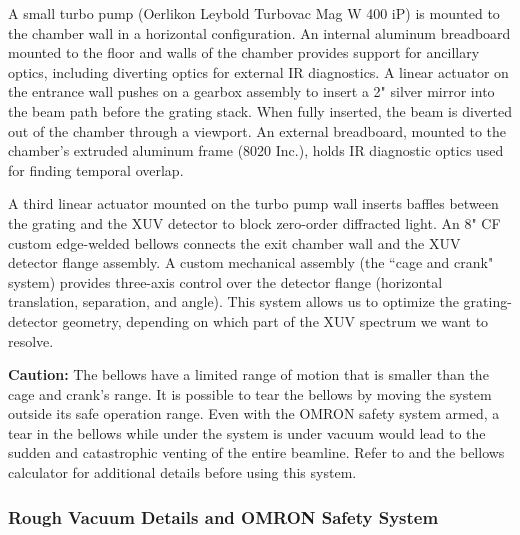 A small turbo pump (Oerlikon Leybold Turbovac Mag W 400 iP) is mounted to the chamber wall in a horizontal configuration. An internal aluminum breadboard mounted to the floor and walls of the chamber provides support for ancillary optics, including diverting optics for external IR diagnostics. A linear actuator on the entrance wall pushes on a gearbox assembly to insert a 2" silver mirror into the beam path before the grating stack. When fully inserted, the beam is diverted out of the chamber through a viewport. An external breadboard, mounted to the chamber's extruded aluminum frame (8020 Inc.), holds IR diagnostic optics used for finding temporal overlap.

A third linear actuator mounted on the turbo pump wall inserts baffles between the grating and the XUV detector to block zero-order diffracted light. An 8" CF custom edge-welded bellows connects the exit chamber wall and the XUV detector flange assembly. A custom mechanical assembly (the ``cage and crank" system) provides three-axis control over the detector flange (horizontal translation, separation, and angle). This system allows us to optimize the grating-detector geometry, depending on which part of the XUV spectrum we want to resolve.

\textbf{Caution:} The bellows have a limited range of motion that is smaller than the cage and crank's range. It is possible to tear the bellows by moving the system outside its safe operation range. Even with the OMRON safety system armed, a tear in the bellows while under the system is under vacuum would lead to the sudden and catastrophic venting of the entire beamline. Refer to \cite{hagemanComplexAttosecondTransientAbsorption2020} and the bellows calculator for additional details before using this system.

\subsubsection{Rough Vacuum Details and OMRON Safety System}
\label{sec:rough_vacuum_details}

